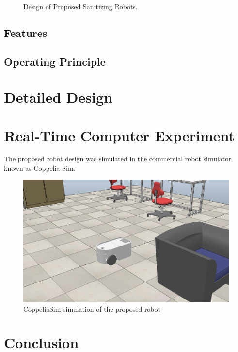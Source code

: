 \documentclass[letterpaper]{article} %
\begin{document}
\begin{figure}[htpb]
  \caption{Design of Proposed Sanitizing Robots.}
  \label{fig:ArchitecturesOfSanitizingRobot}
\end{figure}


\subsection{Features}
\label{sec:Features}

\subsection{Operating Principle}
\label{sec:OperatingPrinciple}



\section{Detailed Design}
\label{sec:DetailedDesign}



\section{Real-Time Computer Experiment}
\label{sec:RealTimeComputerExperiment}
The proposed robot design was simulated in the commercial robot simulator known as Coppelia Sim. 
\begin{figure}[H]
\centering
\includegraphics[scale=0.2]{../figs/img/copSimCap}
\caption{CoppeliaSim simulation of the proposed robot}
\end{figure}

\section{Conclusion}
\label{sec:conclusion}


 
 
\end{document}

